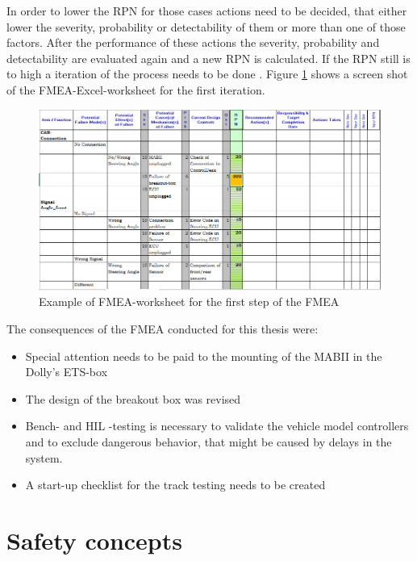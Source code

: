 \documentclass[ExampleMasters.tex]{subfiles}
\begin{document}
In order to lower the \gls{RPN} for those cases actions need to be decided, that either lower the severity, probability or detectability of them or more than one of those factors. After the performance of these actions the severity, probability and detectability are evaluated again and a new \gls{RPN} is calculated. If the \gls{RPN} still is to high a iteration of the process needs to be done \cite{din_60812_fmea}.
Figure \ref{fig:fmea_example} shows a screen shot of the FMEA-Excel-worksheet for the first iteration.    
\begin{figure}[!htb]
	\centering
	\includegraphics[width=1.0\linewidth]{figures/fmea_example}
	\caption{Example of \gls{FMEA}-worksheet for the first step of the FMEA}
	\label{fig:fmea_example}
\end{figure}
The consequences of the \gls{FMEA} conducted for this thesis were:
\begin{itemize}
	\item Special attention needs to be paid to the mounting of the \gls{MABII} in the Dolly's \gls{ETS}-box
	\item The design of the breakout box was revised
	\item Bench- and \gls{HIL} -testing is necessary to validate  the vehicle model controllers and to exclude dangerous behavior, that might be caused by delays in the system. 
	\item A start-up checklist for the track testing needs to be created	 
\end{itemize}  
\section{Safety concepts}
\label{sec:safetyconcepts}
\end{document}
